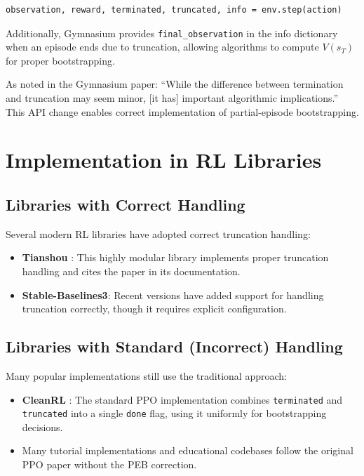 \documentclass[11pt,a4paper]{article}
\begin{document}
\begin{verbatim}
observation, reward, terminated, truncated, info = env.step(action)
\end{verbatim}

Additionally, Gymnasium provides \texttt{final\_observation} in the info dictionary when an episode ends due to truncation, allowing algorithms to compute $V(s_T)$ for proper bootstrapping.

As noted in the Gymnasium paper: ``While the difference between termination and truncation may seem minor, [it has] important algorithmic implications.'' This API change enables correct implementation of partial-episode bootstrapping.

\section{Implementation in RL Libraries}

\subsection{Libraries with Correct Handling}

Several modern RL libraries have adopted correct truncation handling:

\begin{itemize}
    \item \textbf{Tianshou} \citep{weng2022tianshou}: This highly modular library implements proper truncation handling and cites the \citet{pardo2018time} paper in its documentation.
    
    \item \textbf{Stable-Baselines3}: Recent versions have added support for handling truncation correctly, though it requires explicit configuration.
\end{itemize}

\subsection{Libraries with Standard (Incorrect) Handling}

Many popular implementations still use the traditional approach:

\begin{itemize}
    \item \textbf{CleanRL} \citep{huang2022cleanrl}: The standard PPO implementation combines \texttt{terminated} and \texttt{truncated} into a single \texttt{done} flag, using it uniformly for bootstrapping decisions.
    
    \item Many tutorial implementations and educational codebases follow the original PPO paper without the PEB correction.
\end{itemize}
\end{document}

